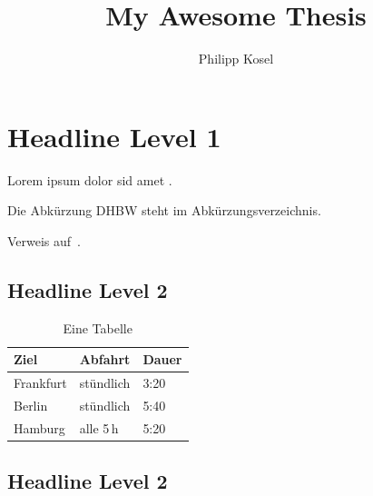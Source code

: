 \documentclass[
12pt,
BCOR=10mm,
a4paper,
bibliography=totoc,
includefoot,
listof=totoc,
smallheadings,
]{scrartcl}
\newcounter{savepage}
\begin{document}
\title{My Awesome Thesis}
\author{Philipp Kosel}

\maketitle
\newpage

\cleardoublepage
{}
\ohead[]{}

\lipsum[1]
\newpage

\lipsum[1]
\newpage

\tableofcontents
\newpage

\listoffigures
\newpage

\listoftables
\newpage

\printnomenclature
\newpage

\cleardoublepage
{}
\ohead[\headmark]{\headmark}

\section{Headline Level 1}
\lipsum[1-2]

Lorem ipsum dolor sid amet \autocite{mcconnell2004}.

Die Abkürzung DHBW steht im Abkürzungsverzeichnis.

Verweis auf~.

\subsection{Headline Level 2}
\lipsum[1]

\begin{table}[htbp]
    \caption{Eine Tabelle}
    \label{tab:tabelle}
    \centering
    \begin{tabular}{lll}
        \toprule
        Ziel      & Abfahrt   & Dauer \\
        \midrule
        Frankfurt & stündlich & 3:20  \\
        Berlin    & stündlich & 5:40  \\
        Hamburg   & alle 5\,h & 5:20  \\
        \bottomrule
    \end{tabular}
\end{table}

\subsection{Headline Level 2}
\lipsum[1]
\end{document}
